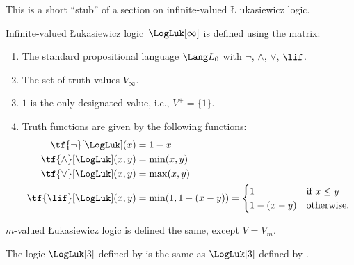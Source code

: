 \documentclass[../../../include/open-logic-section]{subfiles}
\begin{document}

\begin{editorial}
  This is a short ``stub'' of a section on infinite-valued \L
  ukasiewicz logic.
\end{editorial}

\begin{defn} Infinite-valued \L ukasiewicz
logic~$\LogLuk[\infty]$ is defined using the matrix:
\begin{enumerate}
  \item The standard propositional language $\Lang L_0$ with
  $\lnot$, $\land$, $\lor$, $\lif$.
  \item The set of truth values $V_\infty$.
  \item $1$ is the only designated value, i.e., $V^+ = \{1\}$.
  \item Truth functions are given by the following functions:
  \begin{align*}
    \tf{\lnot}[\LogLuk](x) & = 1 - x\\
    \tf{\land}[\LogLuk](x,y) & = \min(x,y)\\
    \tf{\lor}[\LogLuk](x,y) & = \max(x,y)\\
    \tf{\lif}[\LogLuk](x,y) & = \min(1,1-(x-y)) = \begin{cases}
      1 & \text{if } x \le y\\
      1-(x-y) & \text{otherwise.}
    \end{cases}
    \end{align*}
\end{enumerate}
$m$-valued \L ukasiewicz logic is defined the same, except $V = V_m$.
\end{defn}

\begin{prop}
  The logic $\LogLuk[3]$ defined by 
  is the same as $\LogLuk[3]$ defined by .
\end{prop}
\end{document}
